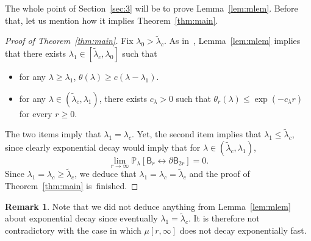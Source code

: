 \documentclass[10pt]{amsart}
\theoremstyle{definition}\newtheorem{defi}[theo]{Definition}\newtheorem{rema}[theo]{Remark}\newtheorem{exam}[theo]{Example}\newtheorem{exem}[theo]{Example}\newtheorem{nota}[theo]{Notation}
\begin{document}
The whole point of Section~\ref{sec:3} will be to prove Lemma~\ref{lem:mlem}. Before that, let us mention how it implies Theorem~\ref{thm:main}.

\begin{proof}[Proof of Theorem~\ref{thm:main}]
Fix $\lambda_0> \widetilde\lambda_c$. As in~\cite[Lemma~3.1]{DumRaoTas16a}, Lemma~\ref{lem:mlem} implies that there exists $\lambda_1\in[\widetilde\lambda_c,\lambda_0]$ such that
\begin{itemize}%
\item for any $\lambda\ge\lambda_1$, $\theta(\lambda)\ge c(\lambda-\lambda_1)$.
\item for any $\lambda\in(\widetilde\lambda_c,\lambda_1)$, there exists $c_\lambda>0$ such that $\theta_r(\lambda)\le \exp(-c_\lambda r)$ for every $r\ge0$.
\end{itemize}
The two items imply that $\lambda_1=\lambda_c$. Yet, the second item implies that $\lambda_1\le \widetilde\lambda_c$, since clearly exponential decay would imply that for $\lambda\in(\widetilde\lambda_c,\lambda_1)$,
\[
\lim_{r\rightarrow\infty}{\mathbb P}_\lambda[\mathsf B_r\stackrel{}{\longleftrightarrow}\partial\mathsf B_{2r}]=0.
\]
Since $\lambda_1 = \lambda_c\ge \widetilde\lambda_c$, we deduce that $\lambda_1=\lambda_c=\widetilde\lambda_c$ and the proof of Theorem~\ref{thm:main} is~finished.
\end{proof}

\begin{rema}
Note that we did not deduce anything from Lemma~\ref{lem:mlem} about exponential decay since eventually $\lambda_1=\widetilde\lambda_c$. It is therefore not contradictory with the case in which $\mu[r,\infty]$ does not decay exponentially fast.
\end{rema}
\end{document}
